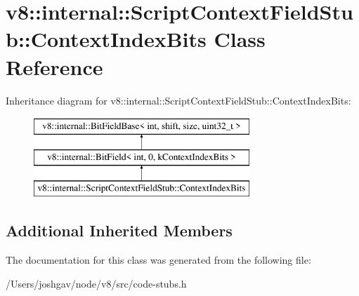 \hypertarget{classv8_1_1internal_1_1_script_context_field_stub_1_1_context_index_bits}{}\section{v8\+:\+:internal\+:\+:Script\+Context\+Field\+Stub\+:\+:Context\+Index\+Bits Class Reference}
\label{classv8_1_1internal_1_1_script_context_field_stub_1_1_context_index_bits}
Inheritance diagram for v8\+:\+:internal\+:\+:Script\+Context\+Field\+Stub\+:\+:Context\+Index\+Bits\+:\begin{figure}[H]
\begin{center}
\leavevmode
\includegraphics[height=3.000000cm]{classv8_1_1internal_1_1_script_context_field_stub_1_1_context_index_bits}
\end{center}
\end{figure}
\subsection*{Additional Inherited Members}


The documentation for this class was generated from the following file\+:\begin{DoxyCompactItemize}
\item 
/\+Users/joshgav/node/v8/src/code-\/stubs.\+h\end{DoxyCompactItemize}
